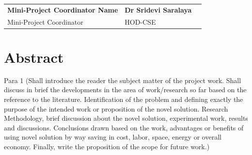 \documentclass[12pt,a4paper]{report}
\begin{document}
\vspace{0.55in}
\par
\vspace{0.65in}

\begin{tabularx}{0.95 \textwidth} { 
   >{\raggedright\arraybackslash}X 
   >{\centering\arraybackslash}X 
   >{\raggedleft\arraybackslash}X  }
     \textbf{Mini-Project Coordinator Name} &  \textbf{Dr Sridevi Saralaya}\\
     Mini-Project Coordinator &   HOD-CSE \\
\end{tabularx}





\pagestyle{plain}
\chapter*{Abstract}
Para 1	(Shall introduce the reader the subject matter of the project work. Shall discuss in brief the developments in the area of work/research so far based on the reference to the literature. Identification of the problem and defining exactly the purpose of the intended work or proposition of the novel solution. Research Methodology, brief discussion about the novel solution, experimental work, results and discussions. Conclusions drawn based on the work, advantages or benefits of using novel solution by way saving in cost, labor, space, energy or overall economy. Finally, write the proposition of the scope for future work.)

\renewcommand{\contentsname}{Table of Contents}
\tableofcontents
{}
\listoffigures
{}
\listoftables
{}
\newpage


\pagestyle{fancy}
\fancyhf{}
\renewcommand{\headrulewidth}{0.5pt}
\renewcommand{\footrulewidth}{0.5pt}
\end{document}
